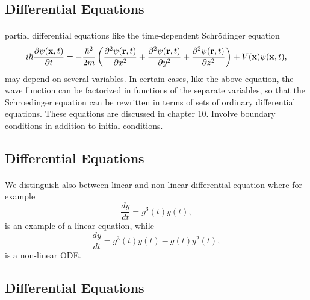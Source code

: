 \documentclass[%
oneside,                 %
final,                   %
10pt]{article}
\begin{document}
\subsection{Differential Equations}

\paragraph{}
partial differential equations like the time-dependent Schr\"odinger
equation 
\begin{equation}
   i\hbar\frac{\partial \psi({\bf x},t)}{\partial t}=
   -\frac{\hbar^2}{2m}\left( \frac{\partial^2 \psi({\bf r},t)}{\partial x^2} +
                            \frac{\partial^2 \psi({\bf r},t)}{\partial y^2}+
                            \frac{\partial^2 \psi({\bf r},t)}{\partial z^2}\right) + V({\bf x})\psi({\bf x},t),
\end{equation}
may depend on several variables. In certain cases, like the above
equation, the wave function can be factorized in functions of the separate
variables, so that the Schroedinger equation 
can be rewritten in terms of sets of ordinary differential equations.
These equations are discussed in chapter 10. Involve boundary conditions in addition to initial conditions.



\subsection{Differential Equations}

\paragraph{}
We distinguish also between linear and non-linear differential
equation where for example
\begin{equation} 
   \frac{dy}{dt}=g^3(t)y(t),
\end{equation}
is an example of a linear equation, while 
\begin{equation} 
   \frac{dy}{dt}=g^3(t)y(t)-g(t)y^2(t),
\end{equation}
is a non-linear ODE.



\subsection{Differential Equations}
\end{document}
